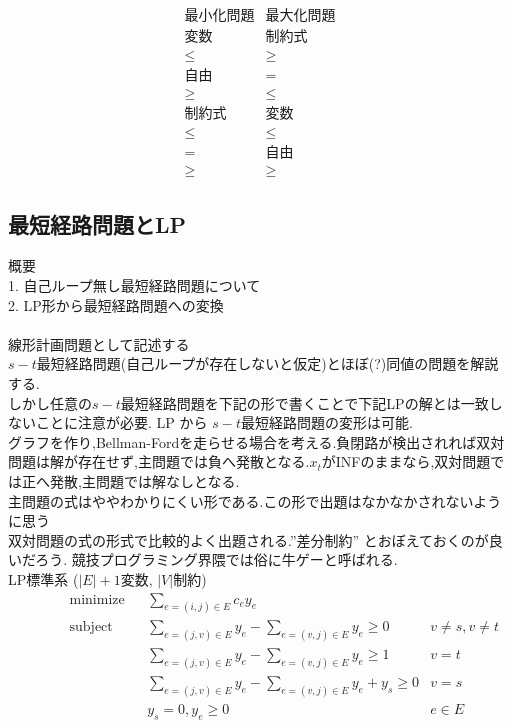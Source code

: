 \documentclass[13pt, a4paper, landscape]{jarticle}
\theoremstyle{nonitalic} %
\begin{document}
\begin{equation*}
\begin{array}{c|c}
  \textrm{最小化問題} &  \textrm{最大化問題} \\ \hline \hline
  \textrm{変数} &  \textrm{制約式} \\ \hline
  \leq & \geq \\
  \textrm{自由} & = \\
  \geq & \leq \\ \hline \hline
  \textrm{制約式} & \textrm{変数} \\ \hline
  \leq & \leq \\
   =   & \textrm{自由} \\
  \geq & \geq
\end{array}
\end{equation*}


\subsection{最短経路問題とLP}

概要 \\
1. 自己ループ無し最短経路問題について \\
2. LP形から最短経路問題への変換 \\
\\

線形計画問題として記述する \\
$s-t$最短経路問題(自己ループが存在しないと仮定)とほぼ(?)同値の問題を解説する. \\
しかし任意の$s-t$最短経路問題を下記の形で書くことで下記LPの解とは一致しないことに注意が必要. LP から $s-t$最短経路問題の変形は可能.\\
 グラフを作り,Bellman-Fordを走らせる場合を考える.負閉路が検出されれば双対問題は解が存在せず,主問題では負へ発散となる.$x_t$がINFのままなら,双対問題では正へ発散,主問題では解なしとなる.\\
主問題の式はややわかりにくい形である.この形で出題はなかなかされないように思う\\
双対問題の式の形式で比較的よく出題される.''差分制約'' とおぼえておくのが良いだろう. 競技プログラミング界隈では俗に牛ゲーと呼ばれる. \\

LP標準系
($|E|+1$変数, $|V|$制約)
\begin{align}
 &&&&&\textrm{minimize}   && \sum_{e=(i,j) \in E} c_e y_e \\
 &&&&&\textrm{subject to} && \sum_{e=(j,v) \in E} y_e - \sum_{e=(v,j) \in E} y_e \geq 0 & v\neq s, v\neq t  &&&&&\\
 &&&&&                    && \sum_{e=(j,v) \in E} y_e - \sum_{e=(v,j) \in E} y_e \geq 1 & v = t  &&&&&\\
 &&&&&                    && \sum_{e=(j,v) \in E} y_e - \sum_{e=(v,j) \in E} y_e  + y_s \geq 0 & v=s &&&&&\\
 &&&&&                    && y_s=0, y_e \geq 0 & e \in E&&&&&
\end{align}
\end{document}
